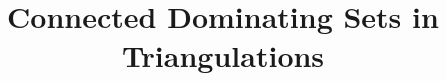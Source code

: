 \documentclass[11pt]{article}
\title{Connected Dominating Sets in Triangulations}
\date{}
\theoremstyle{definition}
\begin{document}
\begin{titlepage}
\maketitle

\begin{abstract}






\end{abstract}
\end{titlepage}
\end{document}
